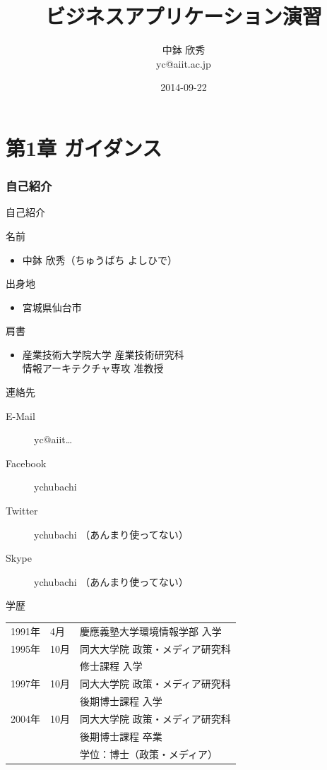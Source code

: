 \documentclass[t, aspectratio=169]{beamer}
\date{\insertpart}
\institute[AIIT]{産業技術大学院大学(AIIT)}
\author{中鉢 欣秀 \\ yc@aiit.ac.jp}
\date{2014-09-22}
\title{ビジネスアプリケーション演習}
\begin{document}
\maketitle

\part{第1章 ガイダンス}
\label{sec-1}
\section{自己紹介}
\label{sec-1-1}
\begin{frame}[label=sec-1-1-1]{自己紹介}
\begin{block}{名前}
\begin{itemize}
\item 中鉢 欣秀（ちゅうばち よしひで）
\end{itemize}
\end{block}
\begin{block}{出身地}
\begin{itemize}
\item 宮城県仙台市
\end{itemize}
\end{block}
\begin{block}{肩書}
\begin{itemize}
\item 産業技術大学院大学 産業技術研究科 \\ 情報アーキテクチャ専攻 准教授
\end{itemize}
\end{block}
\end{frame}
\begin{frame}[label=sec-1-1-2]{連絡先}
\begin{description}
\item[{E-Mail}] yc@aiit\ldots{}
\item[{Facebook}] ychubachi
\item[{Twitter}] ychubachi （あんまり使ってない）
\item[{Skype}] ychubachi （あんまり使ってない）
\end{description}
\end{frame}
\begin{frame}[label=sec-1-1-3]{学歴}
\begin{center}
\begin{tabular}{lll}
1991年 & 4月 & 慶應義塾大学環境情報学部 入学\\
1995年 & \alert{10月} & 同大大学院 政策・メディア研究科\\
 &  & 修士課程 入学\\
1997年 & 10月 & 同大大学院 政策・メディア研究科\\
 &  & 後期博士課程 入学\\
2004年 & 10月 & 同大大学院 政策・メディア研究科\\
 &  & 後期博士課程 卒業\\
 &  & 学位：博士（政策・メディア）\\
\end{tabular}
\end{center}
\end{frame}
\end{document}
